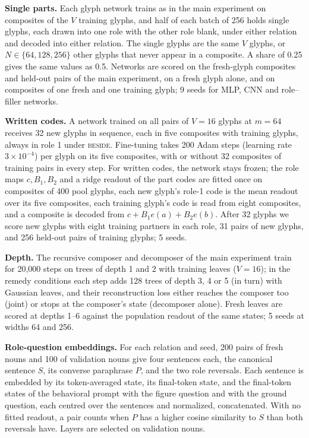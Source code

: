\documentclass[10pt]{article}
\theoremstyle{plain}
\theoremstyle{remark}
\begin{document}
\textbf{Single parts.} Each glyph network trains as in the main experiment on composites of the $V$ training glyphs, and half of each batch of 256 holds single glyphs, each drawn into one role with the other role blank, under either relation and decoded into either relation. The single glyphs are the same $V$ glyphs, or $N \in \{64, 128, 256\}$ other glyphs that never appear in a composite. A share of 0.25 gives the same values as 0.5. Networks are scored on the fresh-glyph composites and held-out pairs of the main experiment, on a fresh glyph alone, and on composites of one fresh and one training glyph; 9 seeds for MLP, CNN and role--filler networks.

\textbf{Written codes.} A network trained on all pairs of $V = 16$ glyphs at $m = 64$ receives 32 new glyphs in sequence, each in five composites with training glyphs, always in role 1 under \textsc{beside}. Fine-tuning takes 200 Adam steps (learning rate $3 \times 10^{-4}$) per glyph on its five composites, with or without 32 composites of training pairs in every step. For written codes, the network stays frozen; the role maps $c, B_1, B_2$ and a ridge readout of the part codes are fitted once on composites of 400 pool glyphs, each new glyph's role-1 code is the mean readout over its five composites, each training glyph's code is read from eight composites, and a composite is decoded from $c + B_1 e(a) + B_2 e(b)$. After 32 glyphs we score new glyphs with eight training partners in each role, 31 pairs of new glyphs, and 256 held-out pairs of training glyphs; 5 seeds.

\textbf{Depth.} The recursive composer and decomposer of the main experiment train for 20{,}000 steps on trees of depth 1 and 2 with training leaves ($V = 16$); in the remedy conditions each step adds 128 trees of depth 3, 4 or 5 (in turn) with Gaussian leaves, and their reconstruction loss either reaches the composer too (joint) or stops at the composer's state (decomposer alone). Fresh leaves are scored at depths 1--6 against the population readout of the same states; 5 seeds at widths 64 and 256.

\textbf{Role-question embeddings.} For each relation and seed, 200 pairs of fresh nouns and 100 of validation nouns give four sentences each, the canonical sentence $S$, its converse paraphrase $P$, and the two role reversals. Each sentence is embedded by its token-averaged state, its final-token state, and the final-token states of the behavioral prompt with the figure question and with the ground question, each centred over the sentences and normalized, concatenated. With no fitted readout, a pair counts when $P$ has a higher cosine similarity to $S$ than both reversals have. Layers are selected on validation nouns.
\end{document}
